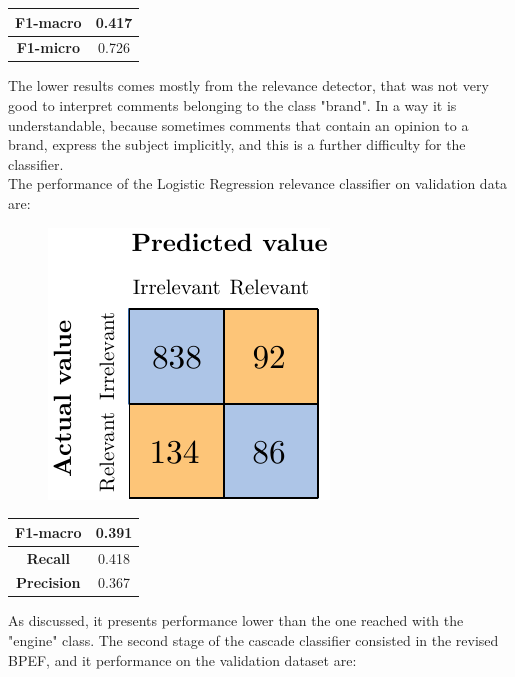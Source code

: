 \begin{center}
	\begin{tabular}{ | c | c | } 
		\hline
		\textbf{F1-macro} & 0.417 \\
		\hline
		\textbf{F1-micro} & 0.726 \\ 
		\hline
	\end{tabular}
\end{center}

The lower results comes mostly from the relevance detector, that was not very good to interpret comments belonging to the class "brand". In a way it is understandable, because sometimes comments that contain an opinion to a brand, express the subject implicitly, and this is a further difficulty for the classifier.\\
The performance of the Logistic Regression relevance classifier on validation data are:

\begin{figure}[H]
	\centering
	\includegraphics[scale=1]{figures/conf_matrices/ita_brand/ita_rel_brand_logreg_afs.pdf}
	\label{fig:ita_rel_brand_logreg_afs}
\end{figure}

\begin{center}
	\begin{tabular}{ | c | c | } 
		\hline
		\textbf{F1-macro} & 0.391 \\
		\hline
		\textbf{Recall} & 0.418 \\ 
		\hline
		\textbf{Precision} & 0.367 \\ 
		\hline
	\end{tabular}
\end{center}

As discussed, it presents performance lower than the one reached with the "engine" class. The second stage of the cascade classifier consisted in the revised BPEF, and it performance on the validation dataset are:

